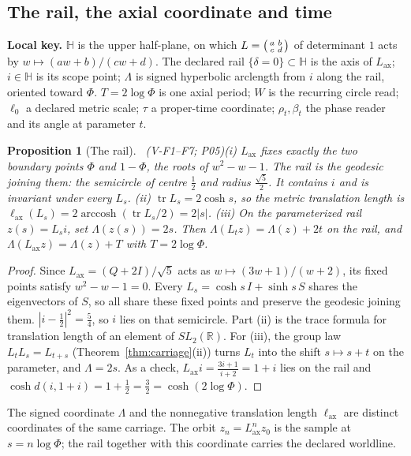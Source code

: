 \documentclass[11pt,a4paper]{article}
\newcommand{\RR}{\mathbb{R}}\newcommand{\QQ}{\mathbb{Q}}\newcommand{\ZZ}{\mathbb{Z}}
\DeclareMathOperator{\tr}{tr}\DeclareMathOperator{\sig}{sig}\DeclareMathOperator{\arccosh}{arccosh}
\newcommand{\Lax}{L_{\mathrm{ax}}}\newcommand{\Lpr}{L_{\mathrm{pr}}}
\newcommand{\lkey}[1]{\par\noindent\textbf{Local key.} #1\par\smallskip}
\theoremstyle{plain}
\newtheorem{prop}[thm]{Proposition}
\theoremstyle{definition}
\theoremstyle{remark}
\begin{document}
\subsection{The rail, the axial coordinate and time}\label{sec:rail}
\lkey{$\mathbb H$ is the upper half-plane, on which $L=\begin{psmallmatrix}a&b\\c&d\end{psmallmatrix}$ of determinant $1$ acts by $w\mapsto(aw+b)/(cw+d)$. The declared rail $\{\delta=0\}\subset\mathbb H$ is the axis of $\Lax$; $i\in\mathbb H$ is its scope point; $\Lambda$ is signed hyperbolic arclength from $i$ along the rail, oriented toward $\Phi$. $T=2\log\Phi$ is one axial period; $W$ is the recurring circle read; $\ell_0$ a declared metric scale; $\tau$ a proper-time coordinate; $\rho_t,\beta_t$ the phase reader and its angle at parameter $t$.}
\begin{prop}[The rail]\Sder\ \textit{(V-F1--F7; P05)}\label{prop:rail}
(i) $\Lax$ fixes exactly the two boundary points $\Phi$ and $1-\Phi$, the roots of $w^2-w-1$. The rail is the geodesic joining them: the semicircle of centre $\tfrac12$ and radius $\tfrac{\sqrt5}{2}$. It contains $i$ and is invariant under every $L_s$.
(ii) $\tr L_s=2\cosh s$, so the metric translation length is $\ell_{\mathrm{ax}}(L_s)=2\arccosh(\tr L_s/2)=2|s|$.
(iii) On the parameterized rail $z(s)=L_si$, set $\Lambda(z(s))=2s$. Then $\Lambda(L_tz)=\Lambda(z)+2t$ on the rail, and $\Lambda(\Lax z)=\Lambda(z)+T$ with $T=2\log\Phi$.
\end{prop}
\begin{proof}
Since $\Lax=(Q+2I)/\sqrt5$ acts as $w\mapsto(3w+1)/(w+2)$, its fixed points satisfy $w^2-w-1=0$. Every $L_s=\cosh s\,I+\sinh s\,S$ shares the eigenvectors of $S$, so all share these fixed points and preserve the geodesic joining them. $|i-\tfrac12|^2=\tfrac54$, so $i$ lies on that semicircle. Part (ii) is the trace formula for translation length of an element of $SL_2(\RR)$. For (iii), the group law $L_tL_s=L_{t+s}$ (Theorem~\ref{thm:carriage}(ii)) turns $L_t$ into the shift $s\mapsto s+t$ on the parameter, and $\Lambda=2s$. As a check, $\Lax i=\tfrac{3i+1}{i+2}=1+i$ lies on the rail and $\cosh d(i,1+i)=1+\tfrac{1}{2}=\tfrac32=\cosh(2\log\Phi)$.
\end{proof}
The signed coordinate $\Lambda$ and the nonnegative translation length $\ell_{\mathrm{ax}}$ are distinct coordinates of the same carriage. The orbit $z_n=\Lax^nz_0$ is the sample at $s=n\log\Phi$; the rail together with this coordinate carries the declared worldline.
\end{document}
